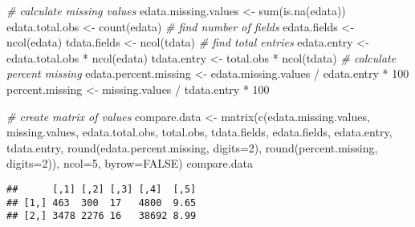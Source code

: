 \documentclass[
]{article}
\newenvironment{Shaded}{\begin{snugshade}}{\end{snugshade}}
\newcommand{\AttributeTok}[1]{\textcolor[rgb]{0.77,0.63,0.00}{#1}}
\newcommand{\CommentTok}[1]{\textcolor[rgb]{0.56,0.35,0.01}{\textit{#1}}}
\newcommand{\ConstantTok}[1]{\textcolor[rgb]{0.00,0.00,0.00}{#1}}
\newcommand{\DecValTok}[1]{\textcolor[rgb]{0.00,0.00,0.81}{#1}}
\newcommand{\FunctionTok}[1]{\textcolor[rgb]{0.00,0.00,0.00}{#1}}
\newcommand{\NormalTok}[1]{#1}
\newcommand{\OtherTok}[1]{\textcolor[rgb]{0.56,0.35,0.01}{#1}}
\newcommand{\SpecialCharTok}[1]{\textcolor[rgb]{0.00,0.00,0.00}{#1}}
\begin{document}
\begin{Shaded}
\begin{Highlighting}[]
\CommentTok{\# calculate missing values}
\NormalTok{edata.missing.values }\OtherTok{\textless{}{-}} \FunctionTok{sum}\NormalTok{(}\FunctionTok{is.na}\NormalTok{(edata))}
\NormalTok{edata.total.obs }\OtherTok{\textless{}{-}} \FunctionTok{count}\NormalTok{(edata)}
\CommentTok{\# find number of fields}
\NormalTok{edata.fields }\OtherTok{\textless{}{-}} \FunctionTok{ncol}\NormalTok{(edata)}
\NormalTok{tdata.fields }\OtherTok{\textless{}{-}} \FunctionTok{ncol}\NormalTok{(tdata)}
\CommentTok{\# find total entries }
\NormalTok{edata.entry }\OtherTok{\textless{}{-}}\NormalTok{ edata.total.obs }\SpecialCharTok{*} \FunctionTok{ncol}\NormalTok{(edata)}
\NormalTok{tdata.entry }\OtherTok{\textless{}{-}}\NormalTok{ total.obs }\SpecialCharTok{*} \FunctionTok{ncol}\NormalTok{(tdata)}
\CommentTok{\# calculate percent missing}
\NormalTok{edata.percent.missing }\OtherTok{\textless{}{-}}\NormalTok{ edata.missing.values }\SpecialCharTok{/}\NormalTok{ edata.entry }\SpecialCharTok{*} \DecValTok{100}
\NormalTok{percent.missing }\OtherTok{\textless{}{-}}\NormalTok{ missing.values }\SpecialCharTok{/}\NormalTok{ tdata.entry }\SpecialCharTok{*} \DecValTok{100}

\CommentTok{\# create matrix of values}
\NormalTok{compare.data }\OtherTok{\textless{}{-}} \FunctionTok{matrix}\NormalTok{(}\FunctionTok{c}\NormalTok{(edata.missing.values, }
\NormalTok{                         missing.values, }
\NormalTok{                         edata.total.obs, }
\NormalTok{                         total.obs, }
\NormalTok{                         tdata.fields, }
\NormalTok{                         edata.fields, }
\NormalTok{                         edata.entry, }
\NormalTok{                         tdata.entry,}
                         \FunctionTok{round}\NormalTok{(edata.percent.missing, }\AttributeTok{digits=}\DecValTok{2}\NormalTok{), }
                         \FunctionTok{round}\NormalTok{(percent.missing, }\AttributeTok{digits=}\DecValTok{2}\NormalTok{)), }\AttributeTok{ncol=}\DecValTok{5}\NormalTok{, }\AttributeTok{byrow=}\ConstantTok{FALSE}\NormalTok{)}
\NormalTok{compare.data}
\end{Highlighting}
\end{Shaded}

\begin{verbatim}
##      [,1] [,2] [,3] [,4]  [,5]
## [1,] 463  300  17   4800  9.65
## [2,] 3478 2276 16   38692 8.99
\end{verbatim}
\end{document}
